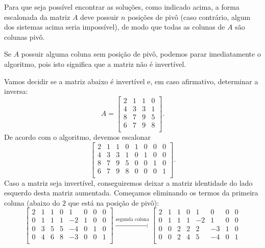 \documentclass[../livro.tex]{subfiles}  %
\begin{document}
\begin{remark}
	Para que seja possível encontrar as soluções, como indicado acima, a forma escalonada da matriz $A$ deve possuir $n$ posições de pivô (caso contrário, algum dos sistemas acima seria impossível), de modo que todas as colunas de $A$ são colunas pivô.
	
	Se $A$ possuir alguma coluna sem posição de pivô, podemos parar imediatamente o algoritmo, pois isto significa que a matriz não é invertível.
\end{remark}


\begin{example}
	Vamos decidir se a matriz abaixo é invertível e, em caso afirmativo, determinar a inversa:
	\[
	A =
	\left[
	\begin{array}{cccc}
	2 & 1 & 1 & 0 \\
	4 & 3 & 3 & 1 \\
	8 & 7 & 9 & 5 \\
	6 & 7 & 9 & 8 \\
	\end{array}
	\right].
	\] De acordo com o algoritmo, devemos escalonar
	\[
	\left[
	\begin{array}{cccc|cccc}
	2 & 1 & 1 & 0 & 1 & 0 & 0 & 0 \\
	4 & 3 & 3 & 1 & 0 & 1 & 0 & 0 \\
	8 & 7 & 9 & 5 & 0 & 0 & 1 & 0 \\
	6 & 7 & 9 & 8 & 0 & 0 & 0 & 1 \\
	\end{array}
	\right].
	\] Caso a matriz seja invertível, conseguiremos deixar a matriz identidade do lado esquerdo desta matriz aumentada. Começamos eliminando os termos da primeira coluna (abaixo do $2$ que está na posição de pivô):
	\[
	\left[
	\begin{array}{cccc|cccc}
	2 & 1 & 1 & 0 & 1 & 0 & 0 & 0 \\
	0 & 1 & 1 & 1 & -2 & 1 & 0 & 0 \\
	0 & 3 & 5 & 5 & -4 & 0 & 1 & 0 \\
	0 & 4 & 6 & 8 & -3 & 0 & 0 & 1 \\
	\end{array}
	\right] \xrightarrow{\text{segunda coluna}}
	\left[
	\begin{array}{cccc|cccc}
	2 & 1 & 1 & 0 & 1 & 0 & 0 & 0 \\
	0 & 1 & 1 & 1 & -2 & 1 & 0 & 0 \\
	0 & 0 & 2 & 2 & 2 & -3 & 1 & 0 \\
	0 & 0 & 2 & 4 & 5 & -4 & 0 & 1 \\

\end{array}\]
\end{example}
\end{document}

